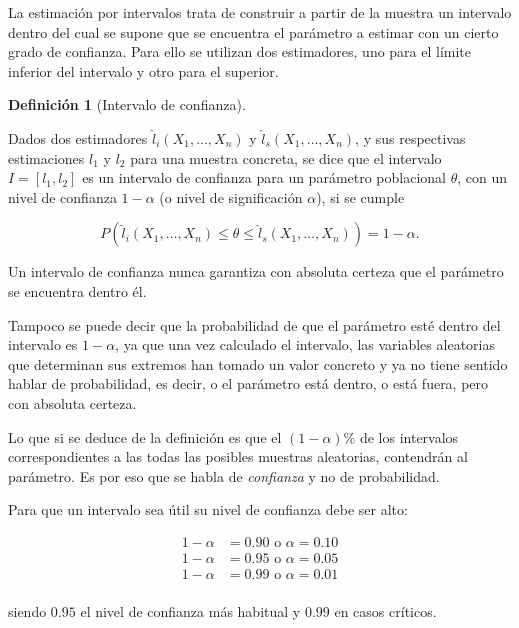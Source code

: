 \documentclass[
  a4paper,
]{scrreport}
\theoremstyle{definition}
\newtheorem{definition}{Definición}[chapter]
\theoremstyle{definition}
\theoremstyle{plain}
\theoremstyle{remark}
\begin{document}
La estimación por intervalos trata de construir a partir de la muestra
un intervalo dentro del cual se supone que se encuentra el parámetro a
estimar con un cierto grado de confianza. Para ello se utilizan dos
estimadores, uno para el límite inferior del intervalo y otro para el
superior.

\begin{definition}[Intervalo de
confianza]\protect\hypertarget{def-intervalo-confianza}{}\label{def-intervalo-confianza}

Dados dos estimadores \(\hat l_i(X_1,\ldots,X_n)\) y
\(\hat l_s(X_1,\ldots,X_n)\), y sus respectivas estimaciones \(l_1\) y
\(l_2\) para una muestra concreta, se dice que el intervalo
\(I=[l_1,l_2]\) es un intervalo de confianza para un parámetro
poblacional \(\theta\), con un nivel de confianza \(1-\alpha\) (o nivel
de significación \(\alpha\)), si se cumple

\[
P(\hat l_i(X_1,\ldots,X_n)\leq \theta \leq \hat l_s(X_1,\ldots,X_n))= 1-\alpha.
\]

\end{definition}

Un intervalo de confianza nunca garantiza con absoluta certeza que el
parámetro se encuentra dentro él.

Tampoco se puede decir que la probabilidad de que el parámetro esté
dentro del intervalo es \(1-\alpha\), ya que una vez calculado el
intervalo, las variables aleatorias que determinan sus extremos han
tomado un valor concreto y ya no tiene sentido hablar de probabilidad,
es decir, o el parámetro está dentro, o está fuera, pero con absoluta
certeza.

Lo que si se deduce de la definición es que el \((1-\alpha)\%\) de los
intervalos correspondientes a las todas las posibles muestras
aleatorias, contendrán al parámetro. Es por eso que se habla de
\emph{confianza} y no de probabilidad.

Para que un intervalo sea útil su nivel de confianza debe ser alto:

\begin{align*}
1-\alpha &= 0.90 \mbox{ o } \alpha=0.10\\
1-\alpha &= {0.95} \mbox{ o } \alpha=0.05\\
1-\alpha &= 0.99 \mbox{ o } \alpha=0.01\\
\end{align*}

siendo \(0.95\) el nivel de confianza más habitual y \(0.99\) en casos
críticos.
\end{document}
